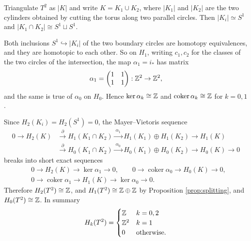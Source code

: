 \documentclass[a4paper]{scrartcl}
\newcommand{\coker}{\operatorname{coker}}
\begin{document}
\begin{example} \label{ex:torus-homology}
	Triangulate $T^2$ as $|K|$ and write $K = K_1 \cup K_2$, where $|K_1|$ and $|K_2|$ are the two cylinders obtained by cutting the torus along two parallel circles. Then $|K_i|\simeq S^1$ and $|K_1\cap K_2| \cong S^1 \sqcup S^1$.

	Both inclusions $S^1 \hookrightarrow |K_i|$ of the two boundary circles are homotopy equivalences, and they are homotopic to each other. So on $H_1$, writing $c_1, c_2$ for the classes of the two circles of the intersection, the map $\alpha_1 = i_*$ has matrix
	$$
	\alpha_1 = \begin{pmatrix}1&1\\1&1\end{pmatrix}: \mathbb{Z}^2 \to \mathbb{Z}^2 ,
	$$
	and the same is true of $\alpha_0$ on $H_0$. Hence $\ker\alpha_k \cong \mathbb{Z}$ and $\coker\alpha_k\cong\Z$ for $k = 0,1$.

	Since $H_2(K_i) = H_2(S^1) = 0$, the Mayer--Vietoris sequence
	\begin{align*}
		0 \to H_2(K) &\xrightarrow{\ \partial\ } H_1(K_1\cap K_2) \xrightarrow{\ \alpha_1\ } H_1(K_1)\oplus H_1(K_2) \to H_1(K)\\
		&\xrightarrow{\ \partial\ } H_0(K_1\cap K_2) \xrightarrow{\ \alpha_0\ } H_0(K_1)\oplus H_0(K_2) \to H_0(K) \to 0
	\end{align*}
	breaks into short exact sequences
	\begin{align*}
		&0 \to H_2(K)\to\ker\alpha_1\to 0, \qquad 0\to\coker\alpha_0\to H_0(K)\to0,\\
		&0 \to \coker\alpha_1 \to H_1(K)\to\ker\alpha_0\to0.
	\end{align*}
	Therefore $H_2(T^2)\cong\mathbb{Z}$, and $H_1(T^2)\cong\mathbb{Z}\oplus\mathbb{Z}$ by Proposition \ref{prop:splitting}, and $H_0(T^2)\cong\mathbb{Z}$. In summary
	$$
	H_k(T^2) = \begin{cases}\mathbb{Z} & k = 0,2\\ \mathbb{Z}^2 & k=1\\ 0&\text{otherwise.}\end{cases}
	$$
\end{example}

\begin{center}
\end{center}
\end{document}
